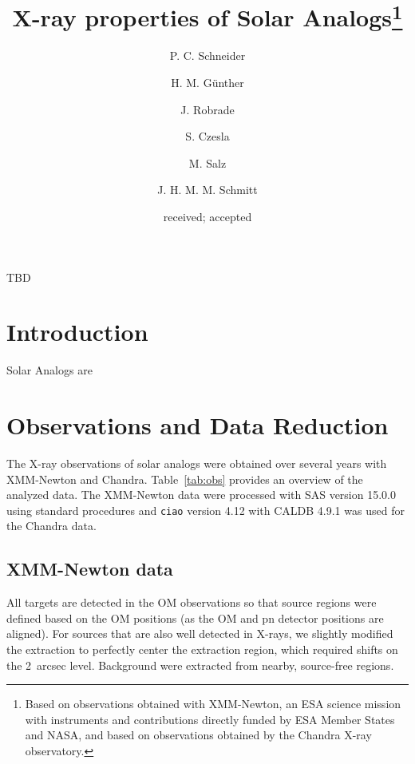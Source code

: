 \documentclass[oldversion]{aa}
\begin{document}
 

\title{X-ray properties of Solar Analogs\thanks{Based on observations obtained with XMM-Newton, an ESA science mission with instruments and contributions directly funded by ESA Member States and NASA, and based on observations obtained by the Chandra X-ray observatory.}}


   \author{P. C. Schneider
          \and
          H. M. G\"unther
          \and
          J. Robrade
          \and
          S. Czesla
          \and
          M. Salz
          \and
          J. H. M. M. Schmitt
          }

     
               
   \date{received; accepted}

 
  \abstract
   {
TBD
     }


   \maketitle
   
\section{Introduction}
Solar Analogs are



\section{Observations and Data Reduction}
The X-ray observations of solar analogs were obtained over several years with XMM-Newton and Chandra. Table~\ref{tab:obs} provides an overview of the analyzed data. The XMM-Newton data were processed with SAS version 15.0.0 using standard procedures
and \texttt{ciao} version 4.12 with CALDB 4.9.1 was used for the Chandra data.

\subsection{XMM-Newton data}
All targets are detected in the OM observations so that source regions were 
defined based on the OM positions (as the OM and pn detector positions are aligned). 
For sources that are also well detected in X-rays, we slightly modified the 
extraction to perfectly center the extraction region, which required shifts on 
the 2~arcsec level. Background were extracted from nearby, source-free regions.








 

\end{document}
